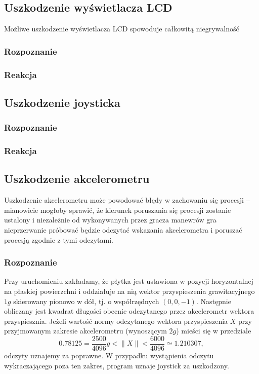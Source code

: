 \documentclass[a4paper,12pt,twoside]{article}
\theoremstyle{plain}
\theoremstyle{definition}
\theoremstyle{remark}
\begin{document}
	\subsection{Uszkodzenie wyświetlacza LCD}
	Możliwe uszkodzenie wyświetlacza LCD spowoduje całkowitą niegrywalność
		\subsubsection{Rozpoznanie}
		\subsubsection{Reakcja}
	\subsection{Uszkodzenie joysticka}
		\subsubsection{Rozpoznanie}
		\subsubsection{Reakcja}
	\subsection{Uszkodzenie akcelerometru}
	Uszkodzenie akcelerometru może powodować błędy w zachowaniu się procesji -- mianowicie mogłoby sprawić, że kierunek poruszania się procesji zostanie ustalony i niezależnie od wykonywanych przez gracza manewrów gra nieprzerwanie próbować będzie odczytać wskazania akcelerometra i poruszać procesją zgodnie z tymi odczytami.
	\subsubsection{Rozpoznanie}
	Przy uruchomieniu zakładamy, że płytka jest ustawiona w pozycji horyzontalnej na płaskiej powierzchni i oddziałuje na nią wektor przyspieszenia grawitacyjnego $1g$ skierowany pionowo w dół, tj. o współrzędnych $(0,0,-1)$. Następnie obliczany jest kwadrat długości obecnie odczytanego przez akcelerometr wektora przyspiesznia. Jeżeli wartość normy odczytanego wektora przyspieszenia $X$ przy przyjmowanym zakresie akcelerometru (wynoszącym $2g$) mieści się w przedziale
	$$0.78125 = \frac{2500}{4096} g < \| X \| < \frac{6000}{4096} \simeq 1.210307 ,$$
	odczyty uznajemy za poprawne. W przypadku wystąpienia odczytu wykraczającego poza ten zakres, program uznaje joystick za uszkodzony.
\end{document}
